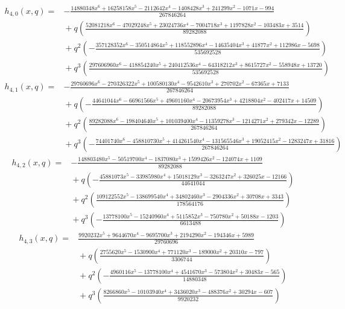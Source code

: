 \[
\begin{split}
h_{4,0}(x,q)={}&- \frac{14880348 x^{6} + 16258158 x^{5} - 2112642 x^{4} - 1408428 x^{3} + 241299 x^{2} - 1071 x - 994}{267846264}\\
&{}+q\left(\frac{52081218 x^{6} - 47029248 x^{5} + 23024736 x^{4} - 7004718 x^{3} + 1197828 x^{2} - 103483 x + 3514}{89282088}\right)\\
&{}+q^{2}\left(- \frac{357128352 x^{6} - 350514864 x^{5} + 118552896 x^{4} - 14635404 x^{3} + 41877 x^{2} + 112986 x - 5698}{535692528}\right)\\
&{}+q^{3}\left(\frac{297606960 x^{6} - 418854240 x^{5} + 240412536 x^{4} - 64318212 x^{3} + 8615727 x^{2} - 558948 x + 13720}{535692528}\right)
\end{split}
\tag{ANP24}
\]
\[
\begin{split}
h_{4,1}(x,q)={}&- \frac{29760696 x^{6} - 270326322 x^{5} + 100580130 x^{4} - 9542610 x^{3} + 270702 x^{2} - 67365 x + 7133}{267846264}\\
&{}+q\left(- \frac{44641044 x^{6} - 66961566 x^{5} + 49601160 x^{4} - 20673954 x^{3} + 4218804 x^{2} - 402417 x + 14509}{89282088}\right)\\
&{}+q^{2}\left(\frac{89282088 x^{6} - 198404640 x^{5} + 101039400 x^{4} - 11359278 x^{3} - 1214271 x^{2} + 279342 x - 12289}{267846264}\right)\\
&{}+q^{3}\left(- \frac{74401740 x^{6} - 458810730 x^{5} + 414261540 x^{4} - 131565546 x^{3} + 19052415 x^{2} - 1283247 x + 31816}{267846264}\right)
\end{split}
\tag{ANP25}
\]
\[
\begin{split}
h_{4,2}(x,q)={}&- \frac{148803480 x^{5} - 50519700 x^{4} - 1837080 x^{3} + 1599426 x^{2} - 124074 x + 1109}{89282088}\\
&{}+q\left(- \frac{45881073 x^{5} - 33985980 x^{4} + 15018129 x^{3} - 3263247 x^{2} + 326025 x - 12166}{44641044}\right)\\
&{}+q^{2}\left(\frac{109122552 x^{5} - 138699540 x^{4} + 34802460 x^{3} - 2904336 x^{2} + 30708 x + 3343}{178564176}\right)\\
&{}+q^{3}\left(- \frac{13778100 x^{5} - 15240960 x^{4} + 5115852 x^{3} - 750780 x^{2} + 50188 x - 1203}{6613488}\right)
\end{split}
\tag{ANP26}
\]
\[
\begin{split}
h_{4,3}(x,q)={}&\frac{9920232 x^{5} + 9644670 x^{4} - 9695700 x^{3} + 2194290 x^{2} - 194346 x + 5989}{29760696}\\
&{}+q\left(\frac{2755620 x^{5} - 1530900 x^{4} + 771120 x^{3} - 189000 x^{2} + 20310 x - 797}{3306744}\right)\\
&{}+q^{2}\left(- \frac{4960116 x^{5} - 13778100 x^{4} + 4541670 x^{3} - 573804 x^{2} + 30483 x - 565}{14880348}\right)\\
&{}+q^{3}\left(\frac{8266860 x^{5} - 10103940 x^{4} + 3436020 x^{3} - 488376 x^{2} + 30294 x - 607}{9920232}\right)
\end{split}
\tag{ANP27}
\]
